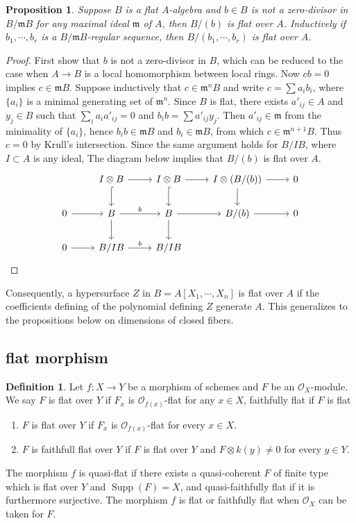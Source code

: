 \documentclass[leqno]{amsart}
\DeclareMathOperator{\Supp}{Supp}
\newcommand{\1}{\mathbf{1}}
\newcommand{\fm}{\mathfrak m}
\newtheorem{prop}[thm]{Proposition}
\theoremstyle{definition}
\newtheorem{defn}[thm]{Definition}
\theoremstyle{remark}
\begin{document}
\begin{prop}
	Suppose $B$ is a flat  $A$-algebra
	and  $b\in B$ is not a zero-divisor in  $B/\fm B$
	for any maximal ideal  $\fm$ of  $A$,
	then $B/(b)$ is flat over $A$.
	Inductively if $b_1,\cdots,b_r$
	is a $B/\fm B$-regular sequence,
	then  $B/(b_1,\cdots,b_r)$ is flat over $A$.
\end{prop}
\begin{proof}
	First show that $b$ is not a zero-divisor in  $B$,
	which can be reduced to the case
	when $A\to B$ is a local homomorphism between local rings.
	Now $cb=0$ implies $c\in\fm B$.
	Suppose inductively that $c\in \fm^nB$
	and write $c=\sum a_ib_i$,
	where  $\{a_i\}$ is a minimal generating set of $\fm^n$.
	Since $B$ is flat, there exists 
	$a'_{ij}\in A$ and $y_j\in B$
	such that $\sum_ia_ia'_{ij}=0$ and $b_ib=\sum a'_{ij}y_j$.
	Then $a'_{ij}\in\fm$ from the minimality of $\{a_i\}$,
	hence $b_ib\in\fm B$ and $b_i\in\fm B$,
	from which  $c\in \fm^{n+1}B$.
	Thus $c=0$ by Krull's intersection.
	Since the same argument holds for
	$B/IB$, where $I\subset A$ is any ideal,
	The diagram below implies that $B/(b)$ is flat over  $A$.
	\[
		\begin{tikzcd}
		&I\otimes B \arrow[r]\arrow[d,hookrightarrow] &
		I\otimes B \arrow[r]\arrow[d,hookrightarrow] 
		& I\otimes(B/(b))\arrow[d]\arrow[r]&0\\
		0\arrow[r]&B \arrow[r,"b"]\arrow[d] &
			B \arrow[r]\arrow[d] &
			B/(b)\arrow[r]&0 \\
		0\arrow[r]&B/IB \arrow[r,"b"] &
			B/IB&
		\end{tikzcd}
	\]
\end{proof}
Consequently, 
a hypersurface $Z$ in $B=A[X_1,\cdots,X_n]$ is flat over $A$
if the coefficients defining of the polynomial defining $Z$
generate $A$.
This generalizes to the propositions
below on dimensions of closed fibers.


\subsection{flat morphism}
\begin{defn}
	Let $f\colon X\to Y$ be a morphism of schemes
	and  $F$ be an $\mathcal{O}_X$-module.
	We say $F$ is flat over $Y$ if $F_x$ is  
	$\mathcal{O}_{f(x)}$-flat for any $x\in X$,
	faithfully flat if $F$ is flat 
	\begin{enumerate}
	\item $F$ is flat over $Y$ if $F_x$ is 
	$\mathcal{O}_{f(x)}$-flat for every $x\in X$.
	\item  $F$ is faithfull flat over $Y$ if 
	$F$ is flat over $Y$ and $F\otimes k(y)\neq 0$
	for every $y\in Y$.
	\end{enumerate}

	The morphism $f$ is quasi-flat if 
	there exists a quasi-coherent $F$ of finite type
	which is flat over $Y$ and $\Supp(F)=X$,
	and quasi-faithfully flat if it is furthermore surjective.
	The morphism $f$ is flat or faithfully flat
	when $\mathcal{O}_X$ can be taken for $F$.
\end{defn}
\end{document}
